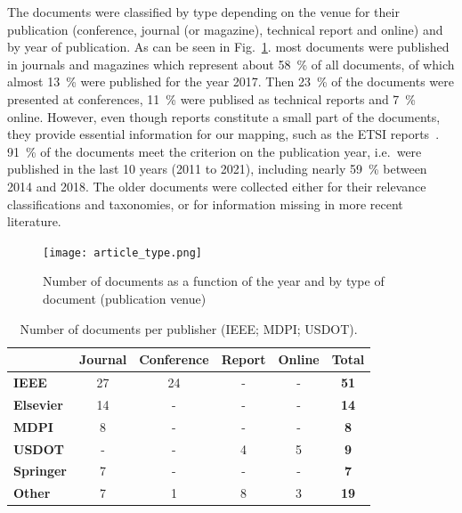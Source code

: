The documents were classified by type depending on the venue for their publication (conference, journal (or magazine), technical report and online) and by year of publication. As can be seen in Fig.~\ref{fig:type_of_article}. 
most documents were published in journals and magazines which represent about 58~\% of all documents, of which almost 13~\% were published for the year 2017. Then 23~\% of the documents were presented at conferences, 11~\% were publised as technical reports and 7~\% online. However, even though reports constitute a small part of the documents, they provide essential information for our mapping, such as the \acrshort{ETSI} reports~\cite{etsi_etsi_tr_102_638_intelligent_2009,etsi_tr_102_863_intelligent_2011}.
91~\% of the documents meet the criterion on the publication year, i.e.\ were published in the last 10 years (2011 to 2021), including nearly 59~\% between 2014 and 2018. The older documents were collected either for their relevance classifications and taxonomies, or for information missing in more recent literature. 

\begin{figure}[ht!]
  \begin{center}
    \texttt{[image: article\_type.png]}
    \caption{Number of documents as a function of the year and by type of document (publication venue)}
    \label{fig:type_of_article}
\end{center}
\end{figure}


\begin{table}[ht!]
\centering
\begin{tabular}[ht!]{p{}ccccc}
\hline
&Journal&Conference&Report&Online&\bf{Total}\\
\hline
\bf{IEEE}&27&24&-&-&\bf{51}\\
\bf{Elsevier}&14&-&-&-&\bf{14}\\
\bf{MDPI}&8&-&-&-&\bf{8}\\
\bf{USDOT}&-&-&4&5&\bf{9}\\
\bf{Springer}&7&-&-&-&\bf{7}\\
\bf{Other}&7&1&8&3&\bf{19}\\
\hline
\end{tabular}
\caption{Number of documents per publisher (\acrfull{IEEE}; \acrfull{MDPI}; \acrfull{USDOT}). }
\label{tab:publisher}
\end{table}


